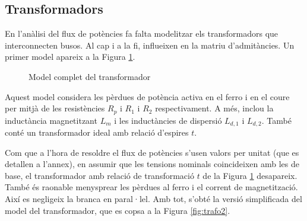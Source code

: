
\subsection{Transformadors} %
En l'anàlisi del flux de potències fa falta modelitzar els transformadors que interconnecten busos. Al cap i a la fi, influeixen en la matriu d'admitàncies. Un primer model apareix a la Figura \ref{fig:trafo1}.

\begin{figure}[!ht] \footnotesize
    \begin{center}
    \caption{Model complet del transformador}
    \label{fig:trafo1}
    \end{center}
    \end{figure}
Aquest model considera les pèrdues de potència activa en el ferro i en el coure per mitjà de les resistències $R_p$ i $R_1$ i $R_2$ respectivament. A més, inclou la inductància magnetitzant $L_m$ i les inductàncies de dispersió $L_{d,1}$ i $L_{d,2}$. També conté un transformador ideal amb relació d'espires $t$.

Com que a l'hora de resoldre el flux de potències s'usen valors per unitat (que es detallen a l'annex), en assumir que les tensions nominals coincideixen amb les de base, el transformador amb relació de transformació $t$ de la Figura \ref{fig:trafo1} desapareix. També és raonable menysprear les pèrdues al ferro i el corrent de magnetització. Així es negligeix la branca en paral·lel. Amb tot, s'obté la versió simplificada del model del transformador, que es copsa a la Figura \ref{fig:trafo2}.

